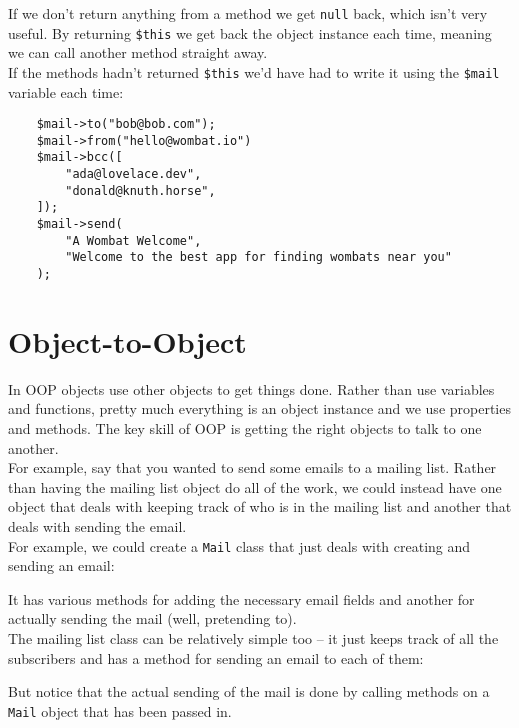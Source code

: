 If we don't return anything from a method we get \texttt{null} back, which isn't very useful. By returning \texttt{\$this} we get back the object instance each time, meaning we can call another method straight away.
\\

If the methods hadn't returned \texttt{\$this} we'd have had to write it using the \texttt{\$mail} variable each time:

\begin{verbatim}
    $mail->to("bob@bob.com");
    $mail->from("hello@wombat.io")
    $mail->bcc([
        "ada@lovelace.dev",
        "donald@knuth.horse",
    ]);
    $mail->send(
        "A Wombat Welcome",
        "Welcome to the best app for finding wombats near you"
    );
\end{verbatim}



\section{Object-to-Object}

In OOP objects use other objects to get things done. Rather than use variables and functions, pretty much everything is an object instance and we use properties and methods. The key skill of OOP is getting the right objects to talk to one another.
\\

For example, say that you wanted to send some emails to a mailing list. Rather than having the mailing list object do all of the work, we could instead have one object that deals with keeping track of who is in the mailing list and another that deals with sending the email.
\\

For example, we could create a \texttt{Mail} class that just deals with creating and sending an email:


It has various methods for adding the necessary email fields and another for actually sending the mail (well, pretending to).
\\

The mailing list class can be relatively simple too – it just keeps track of all the subscribers and has a method for sending an email to each of them:


But notice that the actual sending of the mail is done by calling methods on a \texttt{Mail} object that has been passed in.
\\

